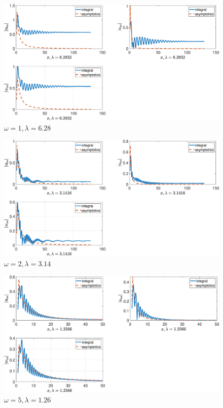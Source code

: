 \begin{figure}[!h]\centering\includegraphics[scale=0.38]{ussw1cp(1)1cp(2)2cs(1)0,3cs(20,5rho(1)1rho(2)2.eps}\caption{$ \omega = 1, \lambda=6.28$}\end{figure}

\begin{figure}[!h]\centering\includegraphics[scale=0.38]{ussw2cp(1)1cp(2)2cs(1)0,3cs(20,5rho(1)1rho(2)2.eps}\caption{$ \omega = 2, \lambda=3.14$}\end{figure}

\begin{figure}[!h]\centering\includegraphics[scale=0.38]{ussw5cp(1)1cp(2)2cs(1)0,3cs(20,5rho(1)1rho(2)2.eps}\caption{$ \omega = 5, \lambda=1.26$}\end{figure}

